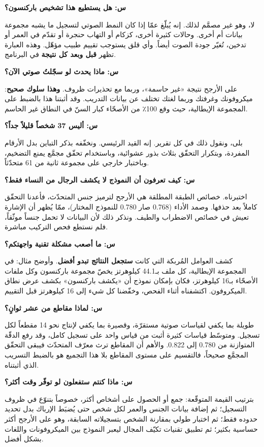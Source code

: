 \documentclass[12pt,a4paper]{report}
\newcommand{\N}[1]{\textenglish{#1}}
\begin{document}
\textbf{س: هل يستطيع هذا تشخيص باركنسون؟}

لا، وهو غير مصمَّم لذلك. إنه يُبلّغ عمّا إذا كان النمط الصوتي لتسجيل ما يشبه مجموعة
بيانات أم أخرى. وحالات كثيرة أخرى، كزكام أو التهاب حنجرة أو تقدّم في العمر أو
تدخين، تُغيّر جودة الصوت أيضاً. وأي قلق يستوجب تقييم طبيب مؤهّل. وهذه العبارة تظهر
\textbf{قبل وبعد كل نتيجة} في البرنامج.

\textbf{س: ماذا يحدث لو سجّلتُ صوتي الآن؟}

على الأرجح نتيجة «غير حاسمة»، وربما مع تحذيرات ظروف. \textbf{وهذا سلوك صحيح}:
ميكروفونك وغرفتك وربما لغتك تختلف عن بيانات التدريب. وقد أثبتنا هذا بالضبط على
المجموعة الإيطالية، حيث وقع \N{100}٪ من الأصحّاء كبار السنّ في النطاق غير الحاسم.

\textbf{س: أليس \N{37} شخصاً قليلاً جداً؟}

بلى، ونقول ذلك في كل تقرير. إنه القيد الرئيسي. ونخفّفه بذكر التباين بدل الأرقام
المفردة، وبتكرار التحقّق بثلاث بذور عشوائية، وباستخدام تحقّق مجمَّع يمنع التضخيم،
وباختبار خارجي على مجموعة ثانية من \N{61} متحدّثاً.

\textbf{س: كيف تعرفون أن النموذج لا يكشف الرجال من النساء فقط؟}

اختبرناه. خصائص الطبقة المطلقة هي الأرجح لترميز جنس المتحدّث، فأعدنا التحقّق كاملاً
بعد حذفها. وصمد الأداء (\N{0.768} صار \N{0.780} للنموذج المختار)، ممّا يُظهر أن
الإشارة تعيش في خصائص الاضطراب والطيف. ونذكر ذلك لأن البيانات لا تحمل جنساً
موثّقاً، فلم نستطع فحص التركيب مباشرة.

\textbf{س: ما أصعب مشكلة تقنية واجهتكم؟}

كشف العوامل المُربكة التي كانت \textbf{ستجعل النتائج تبدو أفضل}. وأوضح مثال: في
المجموعة الإيطالية، كل ملف بـ\N{44.1} كيلوهرتز يخصّ مجموعة باركنسون وكل ملفات
الأصحّاء بـ\N{16} كيلوهرتز، فكان بإمكان نموذج أن «يكشف باركنسون» بكشف عرض نطاق
الميكروفون. اكتشفناه أثناء الفحص، وخفّضنا كل شيء إلى \N{16} كيلوهرتز قبل التقييم.

\textbf{س: لماذا مقاطع من عشر ثوانٍ؟}

طويلة بما يكفي لقياسات صوتية مستقرّة، وقصيرة بما يكفي لإنتاج نحو \N{14} مقطعاً لكل
تسجيل. ومتوسّط قياسات كثيرة أثبت من قياس واحد على تسجيل كامل، وقد رفع الدقّة
المتوازنة من \N{0.780} إلى \N{0.822}. والأهم أن المقاطع ترث معرّف المتحدّث فيبقى
التحقّق المجمَّع صحيحاً، فالتقسيم على مستوى المقاطع بلا هذا التجميع هو بالضبط
التسريب الذي أثبتناه.

\textbf{س: ماذا كنتم ستفعلون لو توفّر وقت أكثر؟}

بترتيب القيمة المتوقّعة: جمع أو الحصول على أشخاص أكثر، خصوصاً بتنوّع في ظروف
التسجيل؛ ثم إضافة بيانات الجنس والعمر لكل شخص حتى يُضبَط الإرباك بدل تحديد حدوده
فقط؛ ثم اختبار طولي بمقارنة الشخص بتسجيلاته السابقة، وهو على الأرجح أكثر حساسية
بكثير؛ ثم تطبيق تقنيات تكيّف المجال ليعبر النموذج بين الميكروفونات واللغات بشكل
أفضل.
\end{document}
